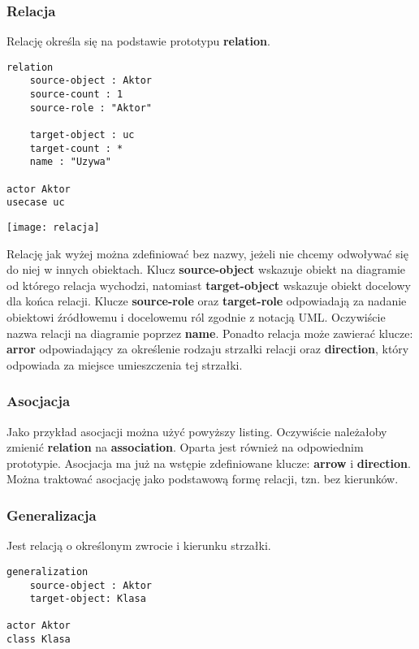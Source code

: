 \subsubsection{Relacja}

Relację określa się na podstawie prototypu \textbf{relation}.
\begin{lstlisting}
relation
    source-object : Aktor
    source-count : 1
    source-role : "Aktor"

    target-object : uc
    target-count : *
    name : "Uzywa"

actor Aktor
usecase uc
\end{lstlisting}

\begin{center}
\texttt{[image: relacja]}
\end{center}

Relację jak wyżej można zdefiniować bez nazwy, jeżeli nie chcemy odwoływać się do niej w innych obiektach. Klucz \textbf{source-object} wskazuje obiekt na diagramie od którego relacja wychodzi, natomiast \textbf{target-object} wskazuje obiekt docelowy dla końca relacji. Klucze \textbf{source-role} oraz \textbf{target-role} odpowiadają za nadanie obiektowi źródłowemu i docelowemu ról zgodnie z notacją UML. Oczywiście nazwa relacji na diagramie poprzez \textbf{name}. Ponadto relacja może zawierać klucze: \textbf{arror} odpowiadający za określenie rodzaju strzałki relacji oraz \textbf{direction}, który odpowiada za miejsce umieszczenia tej strzałki.

\subsubsection{Asocjacja}

Jako przykład asocjacji można użyć powyższy listing. Oczywiście należałoby zmienić \textbf{relation} na \textbf{association}. Oparta jest również na odpowiednim prototypie. Asocjacja ma już na wstępie zdefiniowane klucze: \textbf{arrow} i \textbf{direction}. Można traktować asocjację jako podstawową formę relacji, tzn. bez kierunków.

\subsubsection{Generalizacja}

Jest relacją o określonym zwrocie i kierunku strzałki.
\begin{lstlisting}
generalization
    source-object : Aktor
    target-object: Klasa

actor Aktor
class Klasa
\end{lstlisting}

